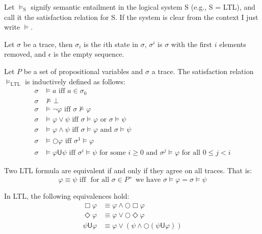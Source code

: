\documentclass[a4paper]{article}
\newcommand{\U}{\mathsf{U}}
\newcommand{\tand}{\text{ and }}
\newcommand{\tor}{\text{ or }}
\newcommand{\tiff}{\text{ iff }}
\newcommand{\fsome}{\text{ for some }}
\newcommand{\fall}{\text{ for all }}
\begin{document}
\begin{notn}
  Let $\vDash_{\text{S}}$ signify semantic entailment in the logical system S (e.g., S = LTL),
  and call it the satisfaction relation for S. If the system is clear from the context I just write $\vDash$.
\end{notn}

\begin{notn}
Let $\sigma$ be a trace, then $\sigma_i$ is the $i$th state in $\sigma$, $\sigma^i$ is $\sigma$ with the first $i$ elements removed, and $\epsilon$ is the empty sequence.
\end{notn}

\begin{defn}\label{ltlsem}

  Let $P$ be a set of propositional variables and $\sigma$ a trace. The satisfaction relation $\vDash_{\text{LTL}}$ is inductively defined as follows:
\begin{align*}
  \sigma &\vDash a \tiff a \in \sigma_0\\
  \sigma &\nvDash \bot\\
  \sigma &\vDash \neg \varphi \tiff \sigma \nvDash \varphi\\
  \sigma &\vDash \varphi \lor \psi \tiff \sigma \vDash \varphi \tor \sigma \vDash \psi\\
  \sigma &\vDash \varphi \land \psi \tiff \sigma \vDash \varphi \tand \sigma \vDash \psi\\
  \sigma &\vDash \bigcirc \varphi \tiff \sigma^1 \vDash \varphi\\
  \sigma &\vDash \varphi \U \psi \tiff \sigma^i \vDash \psi \fsome i \geq 0 \tand \sigma^j \vDash \varphi \fall 0 \leq j < i
\end{align*}

\end{defn}

\begin{defn}
  Two LTL formula are equivalent if and only if they agree on all traces. That is:
  \[\varphi\equiv\psi \tiff \fall \sigma\in P^+ \text{ we have } \sigma\vDash\varphi = \sigma\vDash\psi\]
\end{defn}

\begin{lem}\label{ltlexp}

  In LTL, the following equivalences hold:
  \begin{align}
    \Box \varphi &\equiv \varphi \land \bigcirc \Box \varphi\label{elbox}\\
    \Diamond \varphi &\equiv \varphi \lor \bigcirc \Diamond \varphi\label{eldiamond}\\
    \psi \U \varphi &\equiv \varphi \lor (\psi \land \bigcirc (\psi \U \varphi))\label{elU}
  \end{align}

\end{lem}
\end{document}
